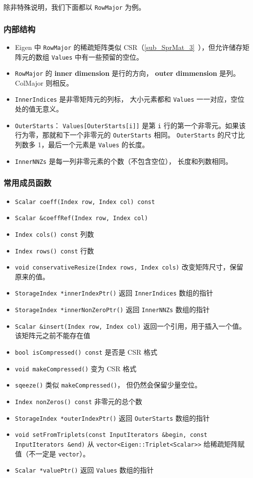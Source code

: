 除非特殊说明，我们下面都以 \verb|RowMajor| 为例。

\subsubsection{内部结构}
\begin{itemize}
\item Eigen 中 \verb|RowMajor| 的稀疏矩阵类似 CSR（\autoref{sub_SprMat_3}~），但允许储存矩阵元的数组 \verb|Values| 中有一些预留的空位。
\item \verb|RowMajor| 的 \textbf{inner dimension} 是行的方向， \textbf{outer dimmension} 是列。 ColMajor 则相反。
\item \verb|InnerIndices| 是非零矩阵元的列标， 大小元素都和 \verb|Values| 一一对应，空位处的值无意义。
\item \verb|OuterStarts|： \verb|Values[OuterStarts[i]]| 是第 \verb|i| 行的第一个非零元。如果该行为零，那就和下一个非零元的 \verb|OuterStarts| 相同。 \verb|OuterStarts| 的尺寸比列数多 1，最后一个元素是 \verb|Values| 的长度。
\item \verb|InnerNNZs| 是每一列非零元素的个数（不包含空位）， 长度和列数相同。
\end{itemize}

\subsubsection{常用成员函数}
\begin{itemize}
\item \verb|Scalar coeff(Index row, Index col) const|
\item \verb|Scalar &coeffRef(Index row, Index col)|
\item \verb|Index cols() const| 列数
\item \verb|Index rows() const| 行数
\item \verb|void conservativeResize(Index rows, Index cols)| 改变矩阵尺寸，保留原来的值。
\item \verb|StorageIndex *innerIndexPtr()| 返回 \verb|InnerIndices| 数组的指针
\item \verb|StorageIndex *innerNonZeroPtr()| 返回 \verb|InnerNNZs| 数组的指针
\item \verb|Scalar &insert(Index row, Index col)| 返回一个引用，用于插入一个值。该矩阵元之前不能存在值
\item \verb|bool isCompressed() const| 是否是 CSR 格式
\item \verb|void makeCompressed()| 变为 CSR 格式
\item \verb|sqeeze()| 类似 \verb|makeCompressed()|， 但仍然会保留少量空位。
\item \verb|Index nonZeros() const| 非零元的总个数
\item \verb|StorageIndex *outerIndexPtr()| 返回 \verb|OuterStarts| 数组的指针

\item \verb|void setFromTriplets(const InputIterators &begin, const InputIterators &end)| 从 \verb|vector<Eigen::Triplet<Scalar>>| 给稀疏矩阵赋值（不一定是 \verb|vector|）。
\item \verb|Scalar *valuePtr()| 返回 \verb|Values| 数组的指针
\end{itemize}

